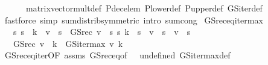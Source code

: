 \begin{isabellebody}
\ \ \ \ \ \ matrix{\isacharunderscore}{\kern0pt}vector{\isacharunderscore}{\kern0pt}mult{\isacharunderscore}{\kern0pt}def\ P{\isacharunderscore}{\kern0pt}dec{\isacharunderscore}{\kern0pt}elem\ P{\isacharunderscore}{\kern0pt}lower{\isacharunderscore}{\kern0pt}def\ P{\isacharunderscore}{\kern0pt}upper{\isacharunderscore}{\kern0pt}def\ GS{\isacharunderscore}{\kern0pt}iter{\isacharunderscore}{\kern0pt}def\isanewline
\ \ \ \ \isamarkupfalse%
\ {\isacharparenleft}{\kern0pt}fastforce\ simp{\isacharcolon}{\kern0pt}\ sum{\isachardot}{\kern0pt}distrib{\isacharbrackleft}{\kern0pt}symmetric{\isacharbrackright}{\kern0pt}\ intro{\isacharbang}{\kern0pt}{\isacharcolon}{\kern0pt}\ sum{\isachardot}{\kern0pt}cong{\isacharparenright}{\kern0pt}\isanewline
{}\isamarkupfalse%
%
\endisatagproof
{\isafoldproof}%
%
\isadelimproof
\isanewline
%
\endisadelimproof
\isanewline
{}\isamarkupfalse%
\ GS{\isacharunderscore}{\kern0pt}rec{\isacharunderscore}{\kern0pt}eq{\isacharunderscore}{\kern0pt}iter{\isacharunderscore}{\kern0pt}max{\isacharcolon}{\kern0pt}\isanewline
\ \ \ {\isachardoublequoteopen}{\isasymAnd}s{\isachardot}{\kern0pt}\ s\ {\isacharless}{\kern0pt}\ k\ {\isasymLongrightarrow}\ v{\isacharprime}{\kern0pt}\ {\isachardollar}{\kern0pt}\ s\ {\isacharequal}{\kern0pt}\ GS{\isacharunderscore}{\kern0pt}rec\ v\ {\isachardollar}{\kern0pt}\ s{\isachardoublequoteclose}\ {\isachardoublequoteopen}{\isasymAnd}s{\isachardot}{\kern0pt}\ k\ {\isasymle}\ s\ {\isasymLongrightarrow}\ v{\isacharprime}{\kern0pt}\ {\isachardollar}{\kern0pt}\ s\ {\isacharequal}{\kern0pt}\ v\ {\isachardollar}{\kern0pt}\ s{\isachardoublequoteclose}\isanewline
\ \ \ {\isachardoublequoteopen}GS{\isacharunderscore}{\kern0pt}rec\ v\ {\isachardollar}{\kern0pt}\ k\ {\isacharequal}{\kern0pt}\ GS{\isacharunderscore}{\kern0pt}iter{\isacharunderscore}{\kern0pt}max\ v{\isacharprime}{\kern0pt}\ k{\isachardoublequoteclose}\isanewline
%
\isadelimproof
\ \ %
\endisadelimproof
%
\isatagproof
{}\isamarkupfalse%
\ GS{\isacharunderscore}{\kern0pt}rec{\isacharunderscore}{\kern0pt}eq{\isacharunderscore}{\kern0pt}iter{\isacharbrackleft}{\kern0pt}OF\ assms{\isacharbrackright}{\kern0pt}\ GS{\isacharunderscore}{\kern0pt}rec{\isacharunderscore}{\kern0pt}eq{\isacharprime}{\kern0pt}{\isacharbrackleft}{\kern0pt}of\ {\isacharunderscore}{\kern0pt}\ {\isacharunderscore}{\kern0pt}\ undefined{\isacharbrackright}{\kern0pt}\ GS{\isacharunderscore}{\kern0pt}iter{\isacharunderscore}{\kern0pt}max{\isacharunderscore}{\kern0pt}def\ \isanewline
\ \ \isamarkupfalse%

\end{isabellebody}
